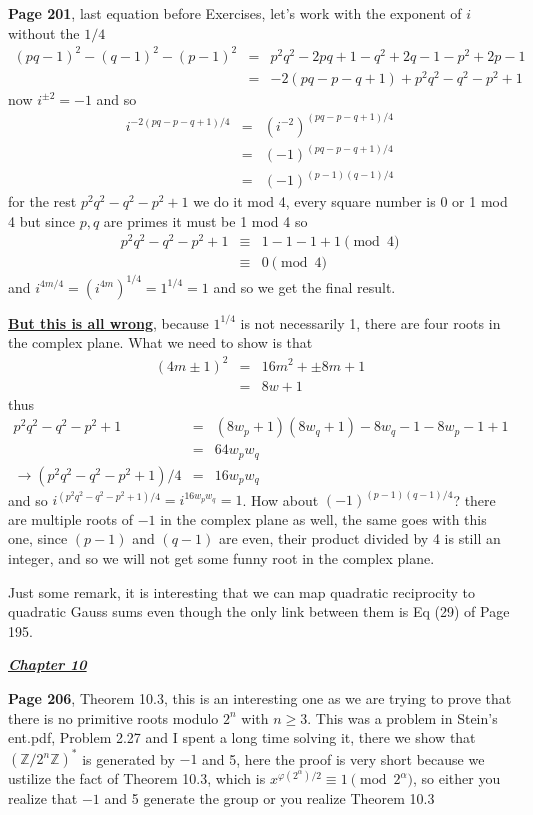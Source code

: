 \documentclass[aps,preprint,preprintnumbers,nofootinbib,showpacs,prd]{revtex4-1}
\newcommand{\nbea}{\begin{eqnarray*}}
\newcommand{\neea}{\end{eqnarray*}}
\begin{document}
{\bf Page 201}, last equation before Exercises, let's work with the exponent of $i$ without the $1/4$
%
\nbea
(pq-1)^2 - (q-1)^2 - (p-1)^2 & = & p^2q^2 - 2pq + 1-q^2 + 2q - 1 - p^2 + 2p - 1 \\
& = & - 2(pq - p - q+1) + p^2q^2 -q^2 - p^2 + 1
\neea
%
now $i^{\pm2} = -1$ and so
%
\nbea
i^{- 2(pq - p - q+1)/4} & = & (i^{-2})^{(pq - p - q+1)/4} \\
& = & (-1)^{(pq - p - q+1)/4} \\
& = & (-1)^{(p - 1)(q-1)/4}
\neea
%
for the rest $p^2q^2 -q^2 - p^2 + 1$ we do it mod 4, every square number is 0 or 1 mod 4 but since $p,q$ are primes it must be 1 mod 4 so
%
\nbea
p^2q^2 -q^2 - p^2 + 1 & \equiv & 1 - 1 - 1 + 1 \pmod{4} \\
& \equiv & 0 \pmod{4}
\neea
%
and $i^{4m/4} = (i^{4m})^{1/4} = 1^{1/4} = 1$ and so we get the final result.

\underline{{\bf But this is all wrong}}, because $1^{1/4}$ is not necessarily 1, there are four roots in the complex plane. What we need to show is that 
%
\nbea
(4m \pm 1)^2 & = & 16m^2 + \pm 8m +1 \\
& = & 8w + 1
\neea
%
thus
%
\nbea
p^2q^2 -q^2 - p^2 + 1 & = & (8w_p + 1)(8w_q + 1) - 8w_q - 1 - 8w_p - 1 + 1 \\
& = & 64w_pw_q \\
\to (p^2q^2 -q^2 - p^2 + 1)/4 & = & 16 w_pw_q
\neea
%
and so $i^{(p^2q^2 -q^2 - p^2 + 1)/4} = i^{16 w_pw_q} = 1$. How about $(-1)^{(p - 1)(q-1)/4}$? there are multiple roots of $-1$ in the complex plane as well, the same goes with this one, since $(p-1)$ and $(q-1)$ are even, their product divided by 4 is still an integer, and so we will not get some funny root in the complex plane.

Just some remark, it is interesting that we can map quadratic reciprocity to quadratic Gauss sums even though the only link between them is Eq (29) of Page 195.

\bigskip
\underline{\textit{\textbf{Chapter 10}}}
\bigskip

{\bf Page 206}, Theorem 10.3, this is an interesting one as we are trying to prove that there is no primitive roots modulo $2^n$ with $n \ge 3$. This was a problem in Stein's ent.pdf, Problem 2.27 and I spent a long time solving it, there we show that $(\mathbb{Z}/2^n\mathbb{Z})^*$ is generated by $-1$ and 5, here the proof is very short because we ustilize the fact of Theorem 10.3, which is $x^{\varphi(2^\alpha)/2} \equiv 1 \pmod{2^\alpha}$, so either you realize that $-1$ and 5 generate the group or you realize Theorem 10.3
\end{document}
